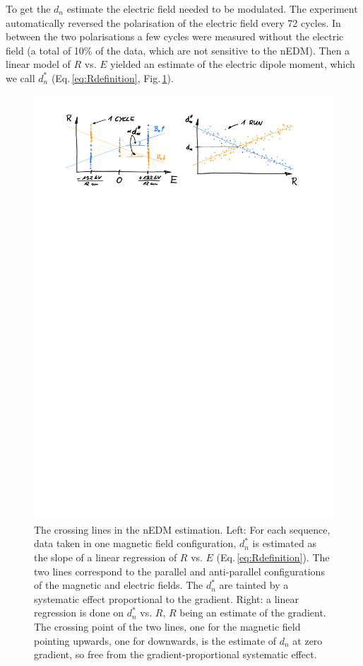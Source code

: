 To get the $d_n$ estimate the electric field needed to be modulated. The experiment automatically reversed the polarisation of the electric field every 72 cycles. In between the two polarisations a few cycles were measured without the electric field (a total of 10\% of the data, which are not sensitive to the nEDM). Then a linear model of  $R$ vs. $E$ yielded an estimate of the electric dipole moment, which we call $d_n^*$ (Eq.\,\ref{eq:Rdefinition}, Fig.\,\ref{fig:crossing_lines}).

\begin{figure}
  \centering
  \includegraphics[width=\linewidth]{gfx/nEDMatPSI/crossing_lines.pdf}
  \caption{The crossing lines in the nEDM estimation. Left: For each sequence, data taken in one magnetic field configuration, $d_n^*$ is estimated as the slope of a linear regression of $R$ vs. $E$ (Eq.\,\ref{eq:Rdefinition}). The two lines correspond to the parallel and anti-parallel configurations of the magnetic and electric fields. The $d_n^*$ are tainted by a systematic effect proportional to the gradient. Right: a linear regression is done on $d_n^*$ vs. $R$, $R$ being an estimate of the gradient. The crossing point of the two lines, one for the magnetic field pointing upwards, one for downwards, is the estimate of $d_n$ at zero gradient, so free from the gradient-proportional systematic effect.}\label{fig:crossing_lines}
\end{figure}

